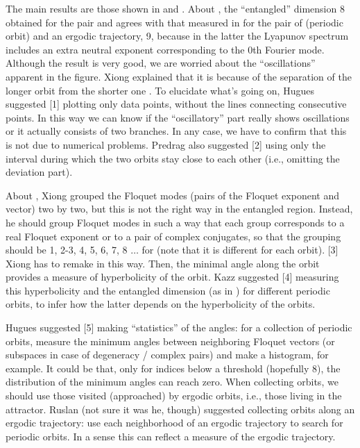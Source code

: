 The main results are those shown in 
 and .
About , the ``entangled'' dimension 8 obtained
 for the pair  and  agrees with
 that measured in  for the pair of  (periodic orbit)
 and an ergodic trajectory, 9, because in the latter the Lyapunov spectrum
 includes an extra neutral exponent corresponding to the 0th Fourier mode.
Although the result is very good, we are worried about the ``oscillations''
 apparent in the figure.
Xiong explained that it is because of the separation of the longer orbit
  from the shorter one .
To elucidate what's going on, Hugues suggested [1] plotting only data points,
 without the lines connecting consecutive points.
In this way we can know if the ``oscillatory'' part really shows oscillations
 or it actually consists of two branches.
In any case, we have to confirm that this is not due to numerical problems.
Predrag also suggested [2] using only the interval
 during which the two orbits stay close to each other
 (i.e., omitting the deviation part).

About , Xiong grouped the Floquet modes
 (pairs of the Floquet exponent and vector) two by two,
 but this is not the right way in the entangled region.
Instead, he should group Floquet modes in such a way that
 each group corresponds to a real Floquet exponent
 or to a pair of complex conjugates,
 so that the grouping should be 1, 2-3, 4, 5, 6, 7, 8 $\dots$
 for  (note that it is different for each orbit).
[3] Xiong has to remake  in this way.
Then, the minimal angle along the orbit provides a measure
 of hyperbolicity of the orbit.
Kazz suggested [4] measuring this hyperbolicity and the entangled dimension
 (as in ) for different periodic orbits,
 to infer how the latter depends on the hyperbolicity of the orbits.

Hugues suggested [5] making ``statistics'' of the angles:
 for a collection of periodic orbits, measure the minimum angles
 between neighboring Floquet vectors
 (or subspaces in case of degeneracy / complex pairs)
 and make a histogram, for example.
It could be that, only for indices below a threshold (hopefully 8),
 the distribution of the minimum angles can reach zero.
When collecting orbits, we should use those visited (approached)
 by ergodic orbits, i.e., those living in the attractor.
Ruslan (not sure it was he, though) suggested collecting orbits
 along an ergodic trajectory: use each neighborhood of an ergodic trajectory
 to search for periodic orbits.
In a sense this can reflect a measure of the ergodic trajectory.

